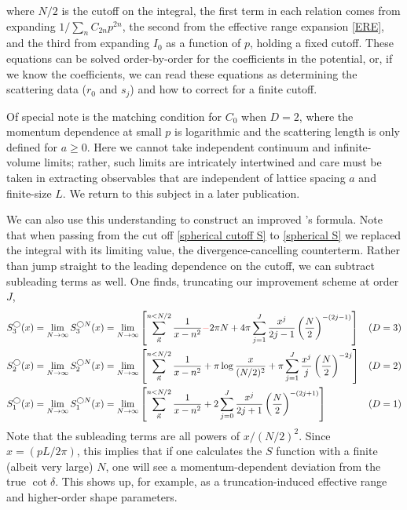 where $N/2$ is the cutoff on the integral, the first term in each relation comes from expanding $1/\sum_n C_{2n} p^{2n}$, the second from the effective range expansion \eqref{ERE}, and the third from expanding $I_0$ as a function of $p$, holding a fixed cutoff.  These equations can be solved order-by-order for the coefficients in the potential, or, if we know the coefficients, we can read these equations as determining the scattering data ($r_0$ and $s_j$) and how to correct for a finite cutoff.

Of special note is the matching condition for $C_0$ when $D=2$, where the momentum dependence at small $p$ is logarithmic and the scattering length is only defined for $a\ge 0$\cite{???}.  Here we cannot take independent continuum and infinite-volume limits; rather, such limits are intricately intertwined and care must be taken in extracting observables that are independent of lattice spacing $a$ and finite-size $L$.  We return to this subject in a later publication\cite{???}.

We can also use this understanding to construct an improved \Luscher's formula.
Note that when passing from the cut off \eqref{spherical cutoff S} to \eqref{spherical S} we replaced the integral with its limiting value, the divergence-cancelling counterterm.
Rather than jump straight to the leading dependence on the cutoff, we can subtract subleading terms as well.
One finds, truncating our improvement scheme at order $J$,
\begin{align}
    S_3^\bigcirc(x)  = \lim_{N\rightarrow\infty} S^{\bigcirc N}_3(x)
    &=
    \lim_{N\rightarrow\infty}\left[\sum_{\vec{n}}^{n<N/2} \frac{1}{x-n^2}{\color{red}-}2\pi N
        + 4\pi \sum_{j=1}^{J} \frac{x^j}{2j-1} \left(\frac{N}{2}\right)^{-(2j-1)}
    \right]
    &
    (D&=3)
    \nonumber\\
    S_2^\bigcirc(x)  = \lim_{N\rightarrow\infty} S^{\bigcirc N}_2(x)
    &=
    \lim_{N\rightarrow\infty}\left[\sum_{\vec{n}}^{n<N/2} \frac{1}{x-n^2}
        + \pi \log \frac{x}{(N/2)^2}
        + \pi \sum_{j=1}^{J} \frac{x^j}{j} \left(\frac{N}{2}\right)^{-2j}
    \right]
    &
    (D&=2)
    \label{eq:improved spherical S}\\\nonumber
    S_1^\bigcirc(x)  = \lim_{N\rightarrow\infty} S^{\bigcirc N}_1(x)
    &=
    \lim_{N\rightarrow\infty}\left[\sum_{\vec{n}}^{n<N/2} \frac{1}{x-n^2}
        + 2 \sum_{j=0}^{J} \frac{x^j}{2j+1}\left(\frac{N}{2}\right)^{-(2j+1)}
        \right]
    &
    (D&=1)
\end{align}
Note that the subleading terms are all powers of $x/(N/2)^2$.
Since $x=(pL/2\pi)$, this implies that if one calculates the $S$ function with a finite (albeit very large) $N$, one will see a momentum-dependent deviation from the true $\cot\delta$.
This shows up, for example, as a truncation-induced effective range and higher-order shape parameters.

